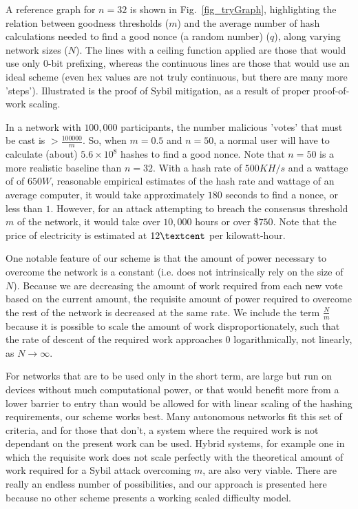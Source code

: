 \documentclass[10pt]{IEEEtran}
\begin{document}
\par A reference graph for $n = 32$ is shown in Fig.~\ref{fig_tryGraph}, highlighting the relation between goodness thresholds ($m$) and the average number of hash calculations needed to find a good nonce (a random number) ($q$), along varying network sizes ($N$). The lines with a ceiling function applied are those that would use only $0$-bit prefixing, whereas the continuous lines are those that would use an ideal scheme (even hex values are not truly continuous, but there are many more 'steps'). Illustrated is the proof of Sybil mitigation, as a result of proper proof-of-work scaling.

\par In a network with $100,000$ participants, the number malicious 'votes' that must be cast is $ > \frac{100000}{m}$. So, when $m = 0.5$ and $n = 50$, a normal user will have to calculate (about) $5.6\times{}10^8$ hashes to find a good nonce. Note that $n = 50$ is a more realistic baseline than $n = 32$. With a hash rate of $500KH/s$ and a wattage of of $650W$, reasonable empirical estimates of the hash rate and wattage of an average computer, it would take approximately $180$ seconds to find a nonce, or less than $1$\textcent. However, for an attack attempting to breach the consensus threshold $m$ of the network, it would take over $10,000$ hours or over $\$750$. Note that the price of electricity is estimated at $12\textcent$ per kilowatt-hour. 

\par One notable feature of our scheme is that the amount of power necessary to overcome the network is a constant (i.e. does not intrinsically rely on the size of $N$). Because we are decreasing the amount of work required from each new vote based on the current amount, the requisite amount of power required to overcome the rest of the network is decreased at the same rate. We include the term $\frac{N}{m}$ because it is possible to scale the amount of work disproportionately, such that the rate of descent of the required work approaches $0$ logarithmically, not linearly, as $N \to \infty$.

\par For networks that are to be used only in the short term, are large but run on devices without much computational power, or that would benefit more from a lower barrier to entry than would be allowed for with linear scaling of the hashing requirements, our scheme works best. Many autonomous networks fit this set of criteria, and for those that don't, a system where the required work is not dependant on the present work can be used. Hybrid systems, for example one in which the requisite work does not scale perfectly with the theoretical amount of work required for a Sybil attack overcoming $m$, are also very viable. There are really an endless number of possibilities, and our approach is presented here because no other scheme presents a working scaled difficulty model.
\end{document}
